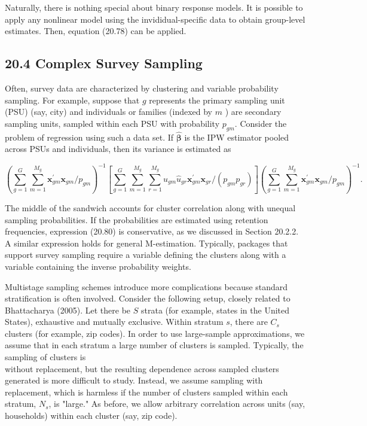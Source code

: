 \documentclass[10pt]{article}
\begin{document}
Naturally, there is nothing special about binary response models. It is possible to apply any nonlinear model using the invididual-specific data to obtain group-level estimates. Then, equation (20.78) can be applied.

\subsection*{20.4 Complex Survey Sampling}
Often, survey data are characterized by clustering and variable probability sampling. For example, suppose that $g$ represents the primary sampling unit (PSU) (say, city) and individuals or families (indexed by $m$ ) are secondary sampling units, sampled within each PSU with probability $p_{g m}$. Consider the problem of regression using such a data set. If $\hat{\boldsymbol{\beta}}$ is the IPW estimator pooled across PSUs and individuals, then its variance is estimated as


\begin{equation*}
\left(\sum_{g=1}^{G} \sum_{m=1}^{M_{g}} \mathbf{x}_{g m}^{\prime} \mathbf{x}_{g m} / p_{g m}\right)^{-1}\left[\sum_{g=1}^{G} \sum_{m=1}^{M_{g}} \sum_{r=1}^{M_{g}} \hat{u}_{g m} \hat{u}_{g r} \mathbf{x}_{g m}^{\prime} \mathbf{x}_{g r} /\left(p_{g m} p_{g r}\right)\right]\left(\sum_{g=1}^{G} \sum_{m=1}^{M_{g}} \mathbf{x}_{g m}^{\prime} \mathbf{x}_{g m} / p_{g m}\right)^{-1} . \tag{20.80}
\end{equation*}


The middle of the sandwich accounts for cluster correlation along with unequal sampling probabilities. If the probabilities are estimated using retention frequencies, expression (20.80) is conservative, as we discussed in Section 20.2.2. A similar expression holds for general M-estimation. Typically, packages that support survey sampling require a variable defining the clusters along with a variable containing the inverse probability weights.

Multistage sampling schemes introduce more complications because standard stratification is often involved. Consider the following setup, closely related to Bhattacharya (2005). Let there be $S$ strata (for example, states in the United States), exhaustive and mutually exclusive. Within stratum $s$, there are $C_{s}$ clusters (for example, zip codes). In order to use large-sample approximations, we assume that in each stratum a large number of clusters is sampled. Typically, the sampling of clusters is\\
without replacement, but the resulting dependence across sampled clusters generated is more difficult to study. Instead, we assume sampling with replacement, which is harmless if the number of clusters sampled within each stratum, $N_{s}$, is "large." As before, we allow arbitrary correlation across units (say, households) within each cluster (say, zip code).
\end{document}
